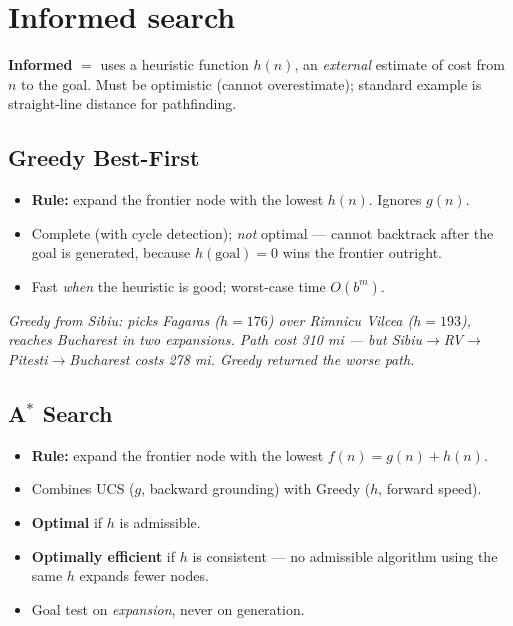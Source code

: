 \documentclass[11pt, a4paper]{article}
\begin{document}
\section{Informed search}

\textbf{Informed} $=$ uses a heuristic function $h(n)$, an \emph{external} estimate of cost from $n$ to the goal. Must be optimistic (cannot overestimate); standard example is straight-line distance for pathfinding.

\subsection{Greedy Best-First}

\begin{card}
\begin{itemize}
  \item \textbf{Rule:} expand the frontier node with the lowest $h(n)$. Ignores $g(n)$.
  \item Complete (with cycle detection); \emph{not} optimal --- cannot backtrack after the goal is generated, because $h(\text{goal}) = 0$ wins the frontier outright.
  \item Fast \emph{when} the heuristic is good; worst-case time $O(b^m)$.
\end{itemize}
\end{card}

\begin{center}

\footnotesize\textit{Greedy from Sibiu: picks Fagaras ($h=176$) over Rimnicu Vilcea ($h=193$), reaches Bucharest in two expansions. Path cost 310 mi --- but Sibiu$\to$RV$\to$Pitesti$\to$Bucharest costs 278 mi. Greedy returned the worse path.}
\end{center}

\subsection{A$^{*}$ Search}

\begin{card}[A$^{*}$ card]
\begin{itemize}
  \item \textbf{Rule:} expand the frontier node with the lowest $f(n) = g(n) + h(n)$.
  \item Combines UCS ($g$, backward grounding) with Greedy ($h$, forward speed).
  \item \textbf{Optimal} if $h$ is admissible.
  \item \textbf{Optimally efficient} if $h$ is consistent --- no admissible algorithm using the same $h$ expands fewer nodes.
  \item Goal test on \emph{expansion}, never on generation.
\end{itemize}
\end{card}
\end{document}
